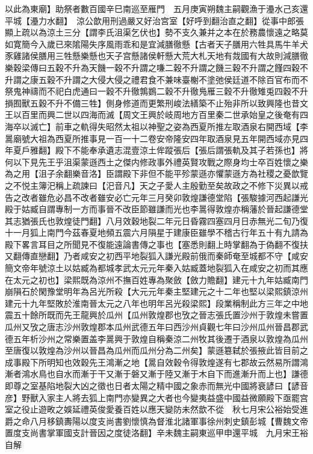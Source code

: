 以此為東廟】助祭者數百國辛巳南巡至雁門　五月庚寅朔魏主嗣觀漁于灅水己亥還平城【灅力水翻】　涼公歆用刑過嚴又好治宫室【好呼到翻治直之翻】從事中郎張顯上疏以為涼土三分【謂李氏沮渠乞伏也】勢不支久兼并之本在於務農懷遠之略莫如寛簡今入歲已來隂陽失序風雨乖和是宜減膳徹懸【古者天子膳用六牲具馬牛羊犬豕雞諸侯膳用三牲懸樂懸也天子宫懸諸侯軒懸大荒大札天地有烖國有大故則減膳徹樂穀梁傳曰五穀不升為天饑一穀不升謂之嗛二穀不升謂之饑三穀不升謂之饉四穀不升謂之康五穀不升謂之大侵大侵之禮君食不兼味臺榭不塗弛侯廷道不除百官布而不祭鬼神禱而不祀白虎通曰一穀不升徹鶉鷃二穀不升徹鳬雁三穀不升徹雉兎四穀不升損囿獸五穀不升不備三牲】側身修道而更繁刑峻法繕築不止殆非所以致興隆也昔文王以百里而興二世以四海而滅【周文王興於岐周地方百里秦二世承始皇之後奄有四海卒以滅亡】前車之軌得失昭然太祖以神聖之姿為西夏所推左取酒泉右開西域【李暠廟號大祖為西夏所推事見一百一十二卷安帝隆安四年取酒泉見五年開西域亦見四年夏戶雅翻】殿下不能奉承遺志混壹涼土侔蹤張后【張后謂張軌及其子若孫也】將何以下見先王乎沮渠蒙遜西土之傑内修政事外禮英賢攻戰之際身均士卒百姓懷之樂為之用【沮子余翻樂音洛】臣謂殿下非但不能平殄蒙遜亦懼蒙遜方為社稷之憂歆覽之不悦主簿汜稱上疏諫曰【汜音凡】天之子愛人主殷勤至矣故政之不修下災異以戒告之改者雖危必昌不改者雖安必亡元年三月癸卯敦煌謙德堂陷【張駿據河西起謙光殿于姑臧自謂專制一方而事晉不改臣節雖謙而光也李暠得敦煌亦稱藩於晉起謙德堂其志猶張氏也敦煌徒門翻】八月效穀地裂二年元日昏霧四塞四月日赤無光二旬乃復十一月狐上南門今茲春夏地頻五震六月隕星于建康臣雖學不稽古行年五十有九請為殿下畧言耳目之所聞見不復能遠論書傳之事也【塞悉則翻上時掌翻為于偽翻不復扶又翻傳直戀翻】乃者咸安之初西平地裂狐入謙光殿前俄而秦師奄至城都不守【咸安簡文帝年號涼土以姑臧為都城孝武太元元年秦入姑臧蓋地裂狐入在咸安之初而其應在太元之初也】梁熙既為涼州不撫百姓專為聚斂【斂力贍翻】建元十九年姑臧南門崩隕石於閑豫堂明年為呂光所殺【大元元年秦主堅建元之十二年也堅以梁熙鎮涼州建元十九年堅敗於淮南晉太元之八年也明年呂光殺梁熙】段業稱制此方三年之中地震五十餘所既而先王龍興於瓜州【瓜州敦煌郡也攷之晉志張氏置沙州于敦煌未嘗置瓜州又攷之唐志沙州敦煌郡本瓜州武德五年曰西沙州貞觀七年曰沙州瓜州晉昌郡武德五年析沙州之常樂置盖李暠興于敦煌自稱秦涼二州牧其後遷于酒泉以敦煌為瓜州至唐復以敦煌為沙州以晉昌為瓜州而瓜州分為二州矣】蒙遜簒弑於張掖此皆目前之成事殿下所明知也效穀先王鴻漸之地【暠自效穀令得敦煌遂有七郡故云然易所謂鴻漸者鴻水鳥也自水而漸于干又漸于磐又漸于陸又漸于木自下而進漸升而上也】謙德即尊之室基陷地裂大凶之徵也日者太陽之精中國之象赤而無光中國將衰諺曰【諺音彦】野獸入家主人將去狐上南門亦變異之大者也今變夷益盛中國益微願殿下亟罷宫室之役止遊畋之娛延禮英俊愛養百姓以應天變防未然歆不從　秋七月宋公裕始受進爵之命八月移鎮夀陽以度支尚書劉懷慎為督淮北諸軍事徐州刺史鎮彭城【曹魏文帝置度支尚書掌軍國支計晉因之度徒洛翻】辛未魏主嗣東巡甲申還平城　九月宋王裕自解

